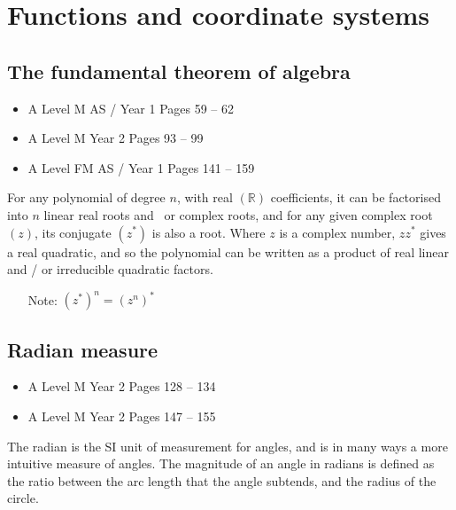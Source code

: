 \documentclass[11pt, a4paper]{article}
\begin{document}
\clearpage
\section{Functions and coordinate systems}
\vspace{0.5cm}

\subsection{The fundamental theorem of algebra}
\label{fundtheory}
\begin{itemize}
\item A Level M AS / Year 1 \hspace{1cm} \phantom{ } Pages 59 -- 62
\item A Level M Year 2 \hspace{1cm} \phantom{ AS / } Pages 93 -- 99
\item A Level FM AS / Year 1 \hspace{1cm} Pages 141 -- 159
\end{itemize} \par
For any polynomial of degree $n$, with real $(\mathbb{R})$ coefficients, it can be factorised into $n$ linear real roots and \ or complex roots, and for any given complex root $(z)$, its conjugate $(z^{*})$ is also a root. Where $z$ is a complex number, $zz^{*}$ gives a real quadratic, and so the polynomial can be written as a product of real linear and / or irreducible quadratic factors.
\begin{itemize}
\item[Note:] $\left( z^{*} \right)^{n} = \left( z^{n} \right)^{*}$
\end{itemize}
\vspace{0.5cm}

\subsection{Radian measure}
\label{radianmeasure}
\begin{itemize}
\item A Level M Year 2 \hspace{1cm} \phantom{ AS / } Pages 128 -- 134
\item A Level M Year 2 \hspace{1cm} \phantom{ AS / } Pages 147 -- 155
\end{itemize} \par
The radian is the SI unit of measurement for angles, and is in many ways a more intuitive measure of angles. The magnitude of an angle in radians is defined as the ratio between the arc length that the angle subtends, and the radius of the circle. \newline \par
\end{document}
